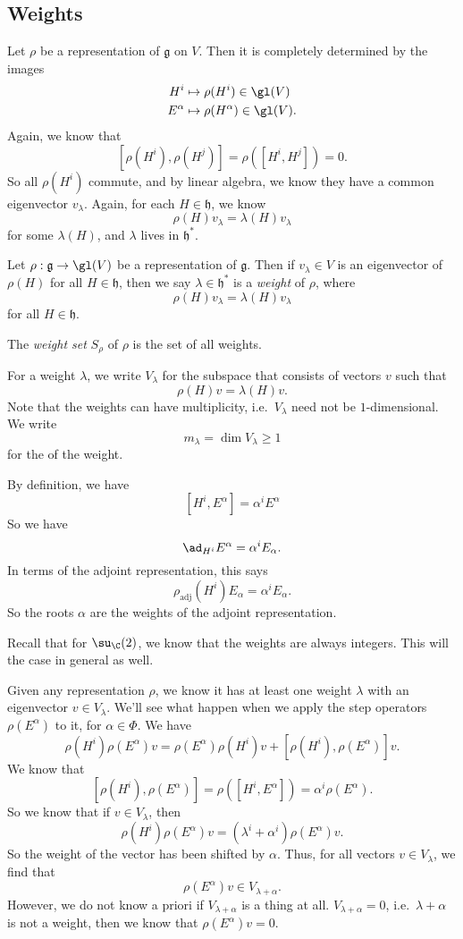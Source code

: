 \documentclass[a4paper]{article}
\begin{document}
\subsection{Weights}
Let $\rho$ be a representation of $\mathfrak{g}$ on $V$. Then it is completely determined by the images
\begin{align*}
  H^i &\mapsto \rho(H^i) \in \gl(V)\\
  E^\alpha &\mapsto \rho(H^\alpha) \in \gl(V).
\end{align*}
Again, we know that
\[
  [\rho(H^i), \rho(H^j)] = \rho([H^i, H^j]) = 0.
\]
So all $\rho(H^i)$ commute, and by linear algebra, we know they have a common eigenvector $v_\lambda$. Again, for each $H \in \mathfrak{h}$, we know
\[
  \rho(H) v_\lambda = \lambda(H) v_\lambda
\]
for some $\lambda(H)$, and $\lambda$ lives in $\mathfrak{h}^*$.
\begin{defi}
  Let $\rho: \mathfrak{g} \to \gl(V)$ be a representation of $\mathfrak{g}$. Then if $v_\lambda \in V$ is an eigenvector of $\rho(H)$ for all $H \in \mathfrak{h}$, then we say $\lambda\in \mathfrak{h}^*$ is a \emph{weight} of $\rho$, where
  \[
    \rho(H) v_\lambda = \lambda(H) v_\lambda
  \]
  for all $H \in \mathfrak{h}$.

  The \emph{weight set} $S_\rho$ of $\rho$ is the set of all weights.
\end{defi}
For a weight $\lambda$, we write $V_\lambda$ for the subspace that consists of vectors $v$ such that
\[
  \rho(H) v = \lambda(H) v.
\]
Note that the weights can have multiplicity, i.e.\ $V_\lambda$ need not be $1$-dimensional. We write
\[
  m_\lambda = \dim V_\lambda \geq 1
\]
for the  of the weight.

\begin{eg}
  By definition, we have
  \[
    [H^i, E^\alpha] = \alpha^i E^\alpha
  \]
  So we have
  \[
    \ad_{H^i} E^\alpha = \alpha^i E_\alpha.
  \]
  In terms of the adjoint representation, this says
  \[
    \rho_{\mathrm{adj}} (H^i) E_\alpha = \alpha^i E_\alpha.
  \]
  So the roots $\alpha$ are the weights of the adjoint representation.
\end{eg}
Recall that for $\su_\C(2)$, we know that the weights are always integers. This will the case in general as well.

Given any representation $\rho$, we know it has at least one weight $\lambda$ with an eigenvector $v \in V_\lambda$. We'll see what happen when we apply the step operators $\rho(E^\alpha)$ to it, for $\alpha \in \Phi$. We have
\[
  \rho(H^i) \rho(E^\alpha)v = \rho(E^\alpha) \rho(H^i) v + [\rho(H^i), \rho(E^\alpha)] v.
\]
We know that
\[
  [\rho(H^i), \rho(E^\alpha)] = \rho([H^i, E^\alpha]) = \alpha^i \rho(E^\alpha).
\]
So we know that if $v \in V_\lambda$, then
\[
  \rho(H^i)\rho(E^\alpha)v = (\lambda^i + \alpha^i) \rho(E^\alpha) v.
\]
So the weight of the vector has been shifted by $\alpha$. Thus, for all vectors $v \in V_\lambda$, we find that
\[
  \rho(E^\alpha) v \in V_{\lambda + \alpha}.
\]
However, we do not know a priori if $V_{\lambda + \alpha}$ is a thing at all. $V_{\lambda + \alpha} = 0$, i.e.\ $\lambda + \alpha$ is not a weight, then we know that $\rho(E^\alpha) v = 0$.
\end{document}
